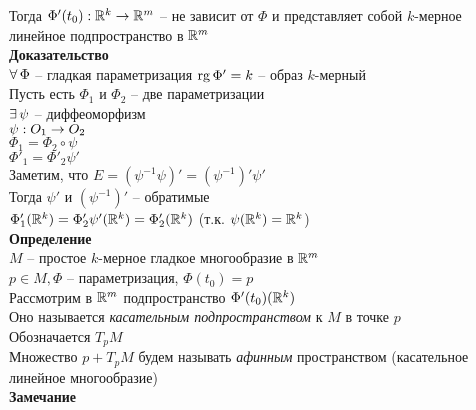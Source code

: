 \documentclass[12pt]{article}
\begin{document}
Тогда $\Phi'(t_0): \mathbb{R}^k \rightarrow \mathbb{R}^m$ -- не зависит от $\Phi$ и представляет собой $k$-мерное линейное подпространство в $\mathbb{R}^m$\\
\textbf{Доказательство}\\
$\forall\, \Phi$ -- гладкая параметризация $\operatorname{rg} \Phi' = k$ -- образ $k$-мерный\\
Пусть есть $\Phi_1$ и $\Phi_2$ -- две параметризации\\
$\exists\, \psi$ -- диффеоморфизм\\
$\psi: O_1 \rightarrow O_2$\\
$\Phi_1 = \Phi_2 \circ \psi$\\
$\Phi'_1 = \Phi'_2 \psi'$\\
Заметим, что $E = (\psi^{-1}\psi)' = (\psi^{-1})' \psi'$\\
Тогда $\psi'$ и $(\psi^{-1})'$ -- обратимые\\
$\Phi'_1(\mathbb{R}^k) = \Phi'_2\psi'(\mathbb{R}^k) = \Phi'_2(\mathbb{R}^k)$ (т.к. $\psi(\mathbb{R}^k) = \mathbb{R}^k$)\\
\textbf{Определение}\\
$M$ -- простое $k$-мерное гладкое многообразие в $\mathbb{R}^m$\\
$p \in M, \Phi$ -- параметризация, $\Phi(t_0) = p$\\
Рассмотрим в $\mathbb{R}^m$ подпространство $\Phi'(t_0)(\mathbb{R}^k)$\\
Оно называется \textit{касательным подпространством} к $M$ в точке $p$\\
Обозначается $T_pM$\\
Множество $p+T_pM$ будем называть \textit{афинным} пространством (касательное линейное многообразие)\\
\textbf{Замечание}
\end{document}
